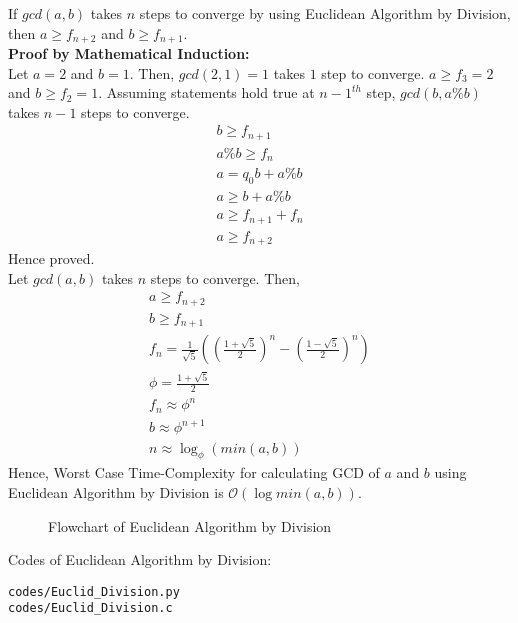 \documentclass[journal,12pt,twocolumn]{IEEEtran}
\begin{document}
If $gcd(a,b)$ takes $n$ steps to converge by using Euclidean Algorithm by Division, then $a \geq f_{n+2}$ and $b \geq f_{n+1}$.\\

\textbf{Proof by Mathematical Induction:}\\
Let $a = 2$ and $b = 1$. Then, $gcd(2,1) = 1$ takes $1$ step to converge. $a \geq f_{3} = 2$ and $b \geq f_{2} = 1$. Assuming statements hold true at ${n-1}^{th}$ step, $gcd(b,a\%b)$ takes $n-1$ steps to converge.
\begin{align}
b \geq f_{n+1}\\
a\%b \geq f_{n}\\
a = q_{0}b + a\%b\\
a \geq b + a\%b\\
a \geq f_{n+1} + f_{n}\\
a \geq f_{n+2}
\end{align}
Hence proved.\\

Let $gcd(a,b)$ takes $n$ steps to converge. Then,
\begin{align}
a \geq f_{n+2}\\
b \geq f_{n+1}\\
f_{n}=\frac{1}{\sqrt{5}}\left(\left(\frac{1+\sqrt{5}}{2}\right)^{n}-\left(\frac{1-\sqrt{5}}{2}\right)^{n}\right)\\
\phi = \frac{1+\sqrt{5}}{2}\\
f_{n} \approx \phi^{n}\\
b \approx \phi^{n+1}\\
n \approx \log_{\phi}{\left(min(a,b)\right)}
\end{align}
Hence, Worst Case Time-Complexity for calculating GCD of $a$ and  $b$ using Euclidean Algorithm by Division is $\mathcal{O}(\log min(a,b))$.\\

\begin{figure}[h!]
	\begin{center}
		\resizebox{\columnwidth/1}{!}{}
	\end{center}
	\caption{Flowchart of Euclidean Algorithm by Division}
	\label{fig:Input}
\end{figure}

Codes of Euclidean Algorithm by Division:
\begin{lstlisting}
codes/Euclid_Division.py
codes/Euclid_Division.c
\end{lstlisting}
\end{document}
